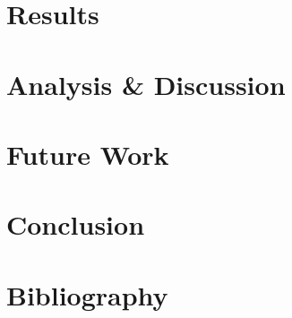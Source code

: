 \documentclass[a4paper,11pt]{article}
\begin{document}
\section{Results}

\section{Analysis \& Discussion}

\section{Future Work}

\section{Conclusion}

\section{Bibliography}
\end{document}
